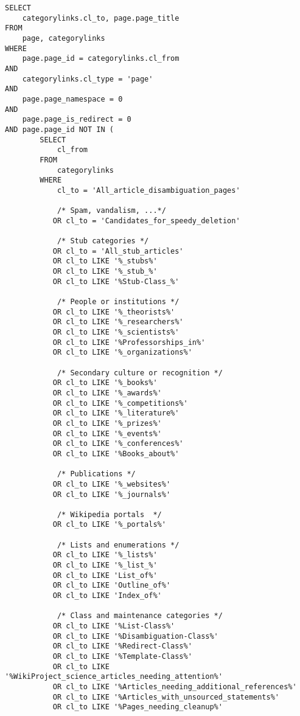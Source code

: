 \begin{sourcecode}
{\scriptsize \begin{verbatim}
SELECT
    categorylinks.cl_to, page.page_title
FROM
    page, categorylinks
WHERE
    page.page_id = categorylinks.cl_from
AND
    categorylinks.cl_type = 'page'
AND
    page.page_namespace = 0
AND 
    page.page_is_redirect = 0
AND page.page_id NOT IN (
        SELECT
            cl_from
        FROM
            categorylinks
        WHERE
            cl_to = 'All_article_disambiguation_pages'

            /* Spam, vandalism, ...*/
           OR cl_to = 'Candidates_for_speedy_deletion'

            /* Stub categories */
           OR cl_to = 'All_stub_articles'
           OR cl_to LIKE '%_stubs%'
           OR cl_to LIKE '%_stub_%'
           OR cl_to LIKE '%Stub-Class_%'

            /* People or institutions */
           OR cl_to LIKE '%_theorists%'
           OR cl_to LIKE '%_researchers%'
           OR cl_to LIKE '%_scientists%'
           OR cl_to LIKE '%Professorships_in%'
           OR cl_to LIKE '%_organizations%'

            /* Secondary culture or recognition */
           OR cl_to LIKE '%_books%'
           OR cl_to LIKE '%_awards%'
           OR cl_to LIKE '%_competitions%'
           OR cl_to LIKE '%_literature%'
           OR cl_to LIKE '%_prizes%'
           OR cl_to LIKE '%_events%'
           OR cl_to LIKE '%_conferences%'
           OR cl_to LIKE '%Books_about%'

            /* Publications */
           OR cl_to LIKE '%_websites%'
           OR cl_to LIKE '%_journals%'

            /* Wikipedia portals  */
           OR cl_to LIKE '%_portals%'

            /* Lists and enumerations */
           OR cl_to LIKE '%_lists%'
           OR cl_to LIKE '%_list_%'
           OR cl_to LIKE 'List_of%'
           OR cl_to LIKE 'Outline_of%'
           OR cl_to LIKE 'Index_of%'
           
            /* Class and maintenance categories */
           OR cl_to LIKE '%List-Class%'
           OR cl_to LIKE '%Disambiguation-Class%'
           OR cl_to LIKE '%Redirect-Class%'
           OR cl_to LIKE '%Template-Class%'
           OR cl_to LIKE '%WikiProject_science_articles_needing_attention%'
           OR cl_to LIKE '%Articles_needing_additional_references%'
           OR cl_to LIKE '%Articles_with_unsourced_statements%'
           OR cl_to LIKE '%Pages_needing_cleanup%'


\end{verbatim}}
\end{sourcecode}
